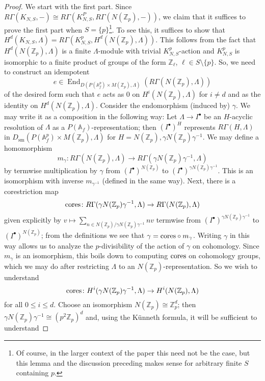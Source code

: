\documentclass{amsart}
\theoremstyle{remark}
\numberwithin{equation}{subsection}
\newcommand{\A}{\AA}
\newcommand{\Z}{\ZZ}
\renewcommand{\AA}{{\mathbb A}}
\newcommand{\ZZ}{{\mathbb Z}}
\newcommand{\Zp}{\Z_p}
\DeclareMathOperator{\End}{End}
\renewcommand{\(}{\left(}
\renewcommand{\)}{\right)}
\begin{document}
\begin{proof}
We start with the first part. Since $R\Gamma(K_{N,S},-) \cong R\Gamma(K_{N,S}^P,R\Gamma(N(\Zp),-))$, we claim that it suffices to prove the first part when $S=\{p\}$\footnote{Of course, in the larger context of the paper this need not be the case, but this lemma and the discussion preceding makes sense for arbitrary finite $S$ containing $p$.}. To see this, it suffices to show that $H^d(K_{N,S},\Lambda) = R\Gamma(K_{N,S}^p, H^d(N(\Zp),\Lambda))$. This follows from the fact that $H^d(N(\Zp),\Lambda)$ is a finite $\Lambda$-module with trivial $K_{N,S}^p$-action and $K_{N,S}^p$ is isomorphic to a finite product of groups of the form $\Z_\ell$, $\ell \in S\setminus \{p\}$. So, we need to construct an idempotent 
\[ 
e\in \End_{D(P(\A_f^p) \times M(\Zp),\Lambda)}(R\Gamma(N(\Z_p), \Lambda))
\]
of the desired form such that $e$ acts as $0$ on $H^i(N(\Z_p), \Lambda)$ for $i\neq d$ and as the identity on $H^d(N(\Z_p), \Lambda)$. Consider the endomorphism (induced by) $\gamma$. We may write it as a composition in the following way: Let $\Lambda \to I^{\bullet}$ be an $H$-acyclic resolution of $\Lambda$ as a $P(\A_f)$-representation; then $(I^{\bullet})^H$ represents $R\Gamma(H,\Lambda)$ in $D_{\mathrm{sm}}(P(\A_f^p)\times M(\Zp),\Lambda)$ for $H=N(\Zp),\gamma N(\Zp)\gamma^{-1}$. We may define a homomorphism
$$ m_{\gamma} \colon R\Gamma(N(\Z_p), \Lambda) \to R\Gamma(\gamma N(\Z_p)\gamma^{-1}, \Lambda) $$
by termwise multiplication by $\gamma$ from $(I^{\bullet})^{N(\Zp)}$ to $(I^{\bullet})^{\gamma N(\Zp) \gamma^{-1}}$. This is an isomorphism with inverse $m_{\gamma^{-1}}$ (defined in the same way). Next, there is a corestriction map
$$ {\rm cores} \colon R\Gamma(\gamma N(\Z_p)\gamma^{-1}, \Lambda) \to  R\Gamma(N(\Z_p), \Lambda) $$
given explicitly by $v \mapsto \sum_{n \in N(\Zp)/\gamma N(\Zp) \gamma^{-1}}nv $ termwise from $(I^{\bullet})^{\gamma N(\Zp) \gamma^{-1}}$ to $(I^{\bullet})^{N(\Zp)}$; from the definitions we see that $\gamma = {\rm cores} \circ m_{\gamma}$. Writing $\gamma$ in this way allows us to analyze the $p$-divisibility of the action of $\gamma$ on cohomology. Since $m_{\gamma}$ is an isomorphism, this boils down to computing ${\rm cores}$ on cohomology groups, which we may do after restricting $\Lambda$ to an $N(\Zp)$-representation. So we wish to understand
$$ {\rm cores} \colon H^{i}(\gamma N(\Zp) \gamma^{-1},\Lambda) \to H^{i}(N(\Zp),\Lambda) $$
for all $0\leq i\leq d$. Choose an isomorphism $N(\Zp)\cong \Zp^{d}$; then $\gamma N(\Zp) \gamma^{-1} \cong (p^{2}\Zp)^{d}$ and, using the K\"unneth formula, it will be sufficient to understand 

\end{proof}
\end{document}
